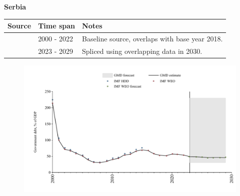\documentclass[12pt,a4paper,landscape]{article}
\begin{document}
\begin{adjustbox}{max totalsize={\paperwidth}{\paperheight},center}
\begin{minipage}[t][\textheight][t]{\textwidth}
\vspace*{0.5cm}
{}
\begin{center}
{\Large\bfseries Serbia}
\end{center}
\vspace{0.5cm}
\begin{table}[H]
\centering
\small
\begin{tabular}{|l|l|l|}
\hline
\textbf{Source} & \textbf{Time span} & \textbf{Notes} \\
\hline
\rowcolor{white}\cite{IMF_WEO}& 2000 - 2022 &Baseline source, overlaps with base year 2018.\\
\rowcolor{lightgray}\cite{IMF_WEO_forecast}& 2023 - 2029 &Spliced using overlapping data in 2030.\\
\hline
\end{tabular}
\end{table}
\begin{figure}[H]
\centering
\includegraphics[width=\textwidth,height=0.6\textheight,keepaspectratio]{graphs/SRB_govdebt_GDP.pdf}
\end{figure}
\end{minipage}
\end{adjustbox}
\end{document}

